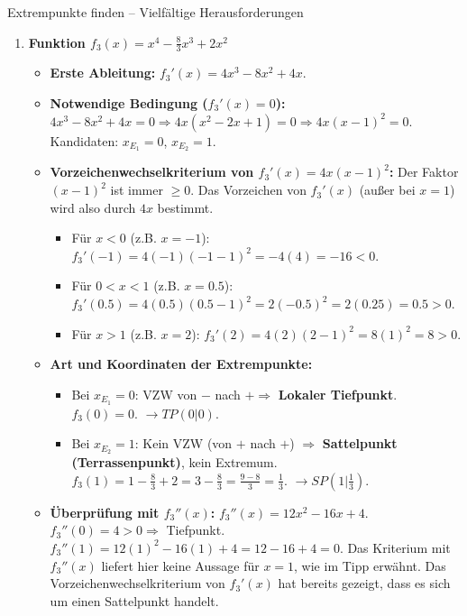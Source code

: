 \begin{loesungsumgebung}{Extrempunkte finden – Vielfältige Herausforderungen}
\begin{enumerate}[label=(\alph*)]
    \item \textbf{Funktion $f_3(x) = x^4 - \frac{8}{3}x^3 + 2x^2$}
    \begin{itemize}
        \item \textbf{Erste Ableitung:} $f_3'(x) = 4x^3 - 8x^2 + 4x$.
        \item \textbf{Notwendige Bedingung ($f_3'(x)=0$):}
        $4x^3 - 8x^2 + 4x = 0 \Rightarrow 4x(x^2 - 2x + 1) = 0 \Rightarrow 4x(x-1)^2 = 0$.
        Kandidaten: $x_E_1 = 0$, $x_E_2 = 1$.
        \item \textbf{Vorzeichenwechselkriterium von $f_3'(x) = 4x(x-1)^2$:}
        Der Faktor $(x-1)^2$ ist immer $\ge 0$. Das Vorzeichen von $f_3'(x)$ (außer bei $x=1$) wird also durch $4x$ bestimmt.
        \begin{itemize}
            \item Für $x < 0$ (z.B. $x=-1$): $f_3'(-1) = 4(-1)(-1-1)^2 = -4(4) = -16 < 0$.
            \item Für $0 < x < 1$ (z.B. $x=0.5$): $f_3'(0.5) = 4(0.5)(0.5-1)^2 = 2(-0.5)^2 = 2(0.25) = 0.5 > 0$.
            \item Für $x > 1$ (z.B. $x=2$): $f_3'(2) = 4(2)(2-1)^2 = 8(1)^2 = 8 > 0$.
        \end{itemize}
        \item \textbf{Art und Koordinaten der Extrempunkte:}
        \begin{itemize}
            \item Bei $x_E_1 = 0$: VZW von $-$ nach $+ \Rightarrow$ \textbf{Lokaler Tiefpunkt}.
            $f_3(0) = 0$.
            $\rightarrow TP(0|0)$.
            \item Bei $x_E_2 = 1$: Kein VZW (von $+$ nach $+$) $\Rightarrow$ \textbf{Sattelpunkt (Terrassenpunkt)}, kein Extremum.
            $f_3(1) = 1 - \frac{8}{3} + 2 = 3 - \frac{8}{3} = \frac{9-8}{3} = \frac{1}{3}$.
            $\rightarrow SP(1|\frac{1}{3})$.
        \end{itemize}
        \item \textbf{Überprüfung mit $f_3''(x)$:}
        $f_3''(x) = 12x^2 - 16x + 4$.
        $f_3''(0) = 4 > 0 \Rightarrow$ Tiefpunkt.
        $f_3''(1) = 12(1)^2 - 16(1) + 4 = 12 - 16 + 4 = 0$. Das Kriterium mit $f_3''(x)$ liefert hier keine Aussage für $x=1$, wie im Tipp erwähnt. Das Vorzeichenwechselkriterium von $f_3'(x)$ hat bereits gezeigt, dass es sich um einen Sattelpunkt handelt.
    \end{itemize}


\end{enumerate}
\end{loesungsumgebung}
